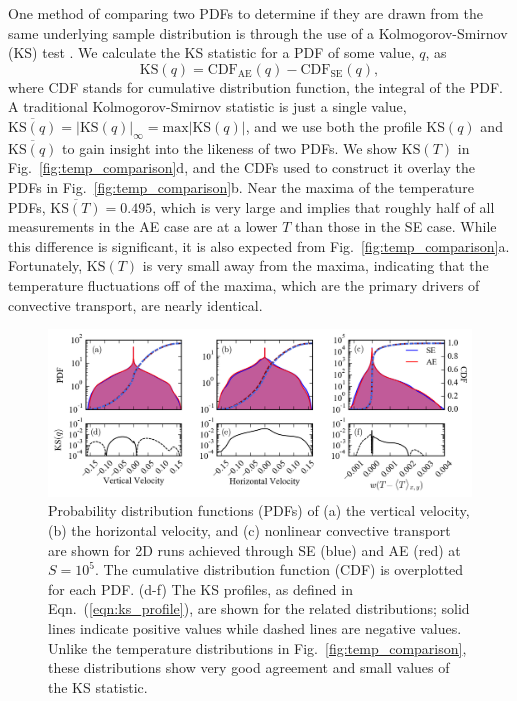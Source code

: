 \documentclass[aps, pre, onecolumn, nofootinbib, notitlepage, groupedaddress, amsfonts, amssymb, amsmath, longbibliography]{revtex4-1}
\newcommand{\KS}[1]{\ensuremath{\text{KS}(#1)}}
\newcommand{\KSstat}[1]{\ensuremath{\overline{\text{KS}(#1)}}}
\begin{document}
One method of comparing two
PDFs to determine if they are drawn from the same underlying
sample distribution is through the use of a Kolmogorov-Smirnov (KS) test \cite{wall&jenkins2012}.
We calculate the KS statistic for a PDF of some value, $q$, as
\begin{equation}
\KS{q} = \text{CDF}_{\text{AE}}(q) - \text{CDF}_{\text{SE}}(q),
\label{eqn:ks_profile}
\end{equation}
where CDF stands for cumulative distribution function, the integral of the PDF.
A traditional Kolmogorov-Smirnov statistic is just a single value,
$\KSstat{q} = |\KS{q}|_\infty =
\text{max} |\KS{q}|$, and we use both the profile KS$(q)$ and
$\KSstat{q}$ to gain insight into the likeness of two PDFs. 
We show $\KS{T}$ in Fig.~\ref{fig:temp_comparison}d, and the
CDFs used to construct it overlay the PDFs in Fig.~\ref{fig:temp_comparison}b.
Near the maxima of the temperature PDFs, $\KSstat{T} = 0.495$, 
which is very large and implies that roughly half of all
measurements in the AE case are at a lower $T$ than those in the SE case.
While this difference is significant, it is also expected from Fig.~\ref{fig:temp_comparison}a.
Fortunately, $\KS{T}$ is very small away from the maxima, 
indicating that the temperature fluctuations off of the maxima, which are the primary
drivers of convective transport, are nearly identical.


\begin{figure}[b!]
\includegraphics[width=\textwidth]{./figs/pdf_comparison.png}
\caption{Probability distribution functions (PDFs) of (a) the vertical velocity, (b) the horizontal velocity, and (c) nonlinear
convective transport are shown for 2D runs achieved through SE (blue) and AE (red)
at $S = 10^{5}$.  The cumulative distribution function (CDF) is overplotted for each PDF. 
(d-f) The KS profiles, as defined in Eqn.~(\ref{eqn:ks_profile}),
are shown for the related distributions; solid lines indicate positive values
while dashed lines are negative values. Unlike the temperature distributions in
Fig.~\ref{fig:temp_comparison}, these distributions
show very good agreement and small values of the KS statistic.
\label{fig:pdf_comparison} }
\end{figure}
\end{document}
